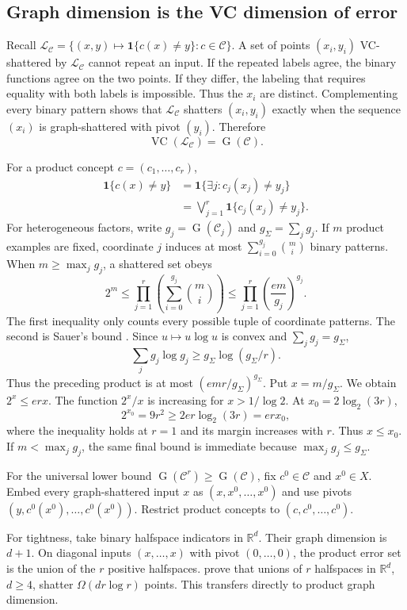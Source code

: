 \documentclass[twoside]{article}
\newcommand{\G}{\operatorname{G}}
\newcommand{\VC}{\operatorname{VC}}
\newcommand{\cC}{\mathcal C}
\newcommand{\cL}{\mathcal L}
\begin{document}
\subsection{Graph dimension is the VC dimension of error}

Recall $\cL_\cC=\{(x,y)\mapsto\mathbf1\{c(x)\neq y\}:c\in\cC\}$. A set of points $(x_i,y_i)$ VC-shattered by $\cL_\cC$ cannot repeat an input. If the repeated labels agree, the binary functions agree on the two points. If they differ, the labeling that requires equality with both labels is impossible. Thus the $x_i$ are distinct. Complementing every binary pattern shows that $\cL_\cC$ shatters $(x_i,y_i)$ exactly when the sequence $(x_i)$ is graph-shattered with pivot $(y_i)$. Therefore
\[
\VC(\cL_\cC)=\G(\cC).
\]

For a product concept $c=(c_1,\ldots,c_r)$,
\begin{align*}
\mathbf1\{c(x)\neq y\}
&=\mathbf1\{\exists j:c_j(x_j)\neq y_j\}\\
&=\bigvee_{j=1}^r\mathbf1\{c_j(x_j)\neq y_j\}.
\end{align*}
For heterogeneous factors, write $g_j=\G(\cC_j)$ and $g_\Sigma=\sum_jg_j$. If $m$ product examples are fixed, coordinate $j$ induces at most $\sum_{i=0}^{g_j}\binom mi$ binary patterns. When $m\geq\max_jg_j$, a shattered set obeys
\[
2^m\leq\prod_{j=1}^r\left(\sum_{i=0}^{g_j}\binom mi\right)
\leq\prod_{j=1}^r\left(\frac{em}{g_j}\right)^{g_j}.
\]
The first inequality only counts every possible tuple of coordinate patterns. The second is Sauer's bound \citep{sauer1972}. Since $u\mapsto u\log u$ is convex and $\sum_jg_j=g_\Sigma$,
\[
\sum_jg_j\log g_j\geq g_\Sigma\log(g_\Sigma/r).
\]
Thus the preceding product is at most $(emr/g_\Sigma)^{g_\Sigma}$. Put $x=m/g_\Sigma$. We obtain $2^x\leq erx$. The function $2^x/x$ is increasing for $x>1/\log2$. At $x_0=2\log_2(3r)$,
\[
2^{x_0}=9r^2\geq2er\log_2(3r)=erx_0,
\]
where the inequality holds at $r=1$ and its margin increases with $r$. Thus $x\leq x_0$. If $m<\max_jg_j$, the same final bound is immediate because $\max_jg_j\leq g_\Sigma$.

For the universal lower bound $\G(\cC^r)\geq\G(\cC)$, fix $c^0\in\cC$ and $x^0\in X$. Embed every graph-shattered input $x$ as $(x,x^0,\ldots,x^0)$ and use pivots $(y,c^0(x^0),\ldots,c^0(x^0))$. Restrict product concepts to $(c,c^0,\ldots,c^0)$.

For tightness, take binary halfspace indicators in $\mathbb R^d$. Their graph dimension is $d+1$. On diagonal inputs $(x,\ldots,x)$ with pivot $(0,\ldots,0)$, the product error set is the union of the $r$ positive halfspaces. \citet{csikos2019} prove that unions of $r$ halfspaces in $\mathbb R^d$, $d\geq4$, shatter $\Omega(dr\log r)$ points. This transfers directly to product graph dimension.
\end{document}
